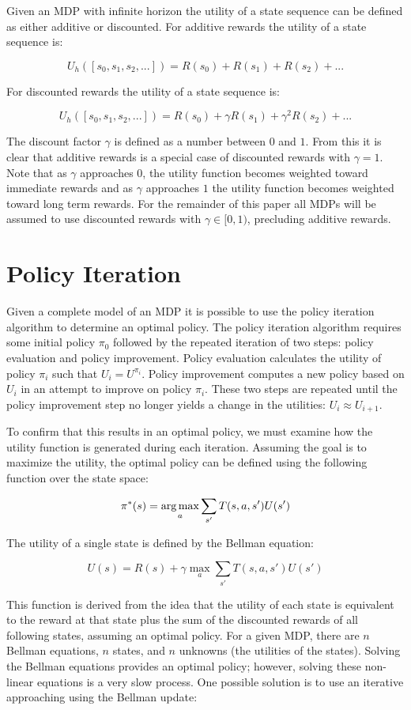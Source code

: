 Given an MDP with infinite horizon the utility of a state sequence can be defined as either additive or discounted. For additive rewards the utility of a state sequence is:

\[
    U_h([s_0,s_1,s_2,...]) = R(s_0) + R(s_1) + R(s_2) + ...
\]

For discounted rewards the utility of a state sequence is:

\[
    U_h([s_0,s_1,s_2,...]) = R(s_0) + \gamma R(s_1) + \gamma^2 R(s_2) + ...
\]

The discount factor $\gamma$ is defined as a number between $0$ and $1$. From this it is clear that additive rewards is a special case of discounted rewards with $\gamma = 1$.  Note that as $\gamma$ approaches $0$, the utility function becomes weighted toward immediate rewards and as $\gamma$ approaches $1$ the utility function becomes weighted toward long term rewards. For the remainder of this paper all MDPs will be assumed to use discounted rewards with $\gamma \in [0, 1)$, precluding additive rewards.

\section{Policy Iteration}

Given a complete model of an MDP it is possible to use the policy iteration algorithm to determine an optimal policy. The policy iteration algorithm requires some initial policy $\pi_0$ followed by the repeated iteration of two steps: policy evaluation and policy improvement. Policy evaluation calculates the utility of policy $\pi_i$ such that $U_i = U^{\pi_i}$. Policy improvement computes a new policy based on $U_i$ in an attempt to improve on policy $\pi_i$. These two steps are repeated until the policy improvement step no longer yields a change in the utilities: $U_i \approx U_{i+1}$. 

To confirm that this results in an optimal policy, we must examine how the utility function is generated during each iteration. Assuming the goal is to maximize the utility, the optimal policy can be defined using the following function over the state space:

\[
    \pi^*(s) = \operatorname*{arg\,max}_a \sum_{s'} T(s,a,s')U(s')
\]

The utility of a single state is defined by the Bellman equation:

\[
    U(s) = R(s) + \gamma \max_a \sum_{s'}T(s,a,s')U(s')
\]

This function is derived from the idea that the utility of each state is equivalent to the reward at that state plus the sum of the discounted rewards of all following states, assuming an optimal policy. For a given MDP, there are $n$ Bellman equations, $n$ states, and $n$ unknowns (the utilities of the states). Solving the Bellman equations provides an optimal policy; however, solving these non-linear equations is a very slow process. One possible solution is to use an iterative approaching using the Bellman update:

